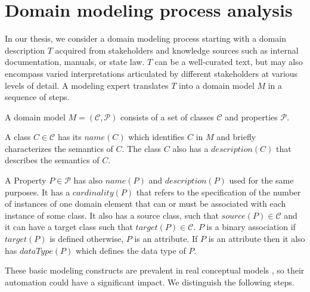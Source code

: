 \chapter{Domain modeling process analysis}
\label{chap:domain_modeling_process_analysis}

In our thesis, we consider a domain modeling process starting with a domain description $T$ acquired from stakeholders and knowledge sources such as internal documentation, manuals, or state law. $T$ can be a well-curated text, but may also encompass varied interpretations articulated by different stakeholders at various levels of detail. A modeling expert translates $T$ into a domain model $M$ in a sequence of steps.

A domain model $M = (\mathcal{C}, \mathcal{P})$ consists of a set of classes $\mathcal{C}$ and properties $\mathcal{P}$.

A class $C \in \mathcal{C}$ has its $name(C)$ which identifies $C$ in $M$ and briefly characterizes the semantics of $C$. The class $C$ also has a $description(C)$ that describes the semantics of $C$.

A Property $P \in \mathcal{P}$ has also $name(P)$ and $description(P)$ used for the same purposes. It has a $cardinality(P)$ that refers to the specification of the number of instances of one domain element that can or must be associated with each instance of some class. It also has a source class, such that $source(P) \in \mathcal{C}$ and it can have a target class such that $target(P) \in \mathcal{C}$. $P$ is a binary association if $target(P)$ is defined otherwise, $P$ is an attribute. If $P$ is an attribute then it also has $dataType(P)$ which defines the data type of $P$.

These basic modeling constructs are prevalent in real conceptual models \cite{Keet2015}, so their automation could have a significant impact. We distinguish the following steps.


